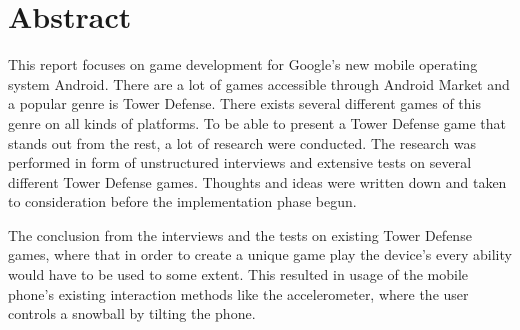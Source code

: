 \section*{Abstract}

This report focuses on game development for Google's new mobile operating system Android. There are a lot of games accessible through Android Market and a popular genre is Tower Defense. There exists several different games of this genre on all kinds of platforms. To be able to present a Tower Defense game that stands out from the rest, a lot of research were conducted. The research was performed in form of unstructured interviews and extensive tests on several different Tower Defense games. Thoughts and ideas were written down and taken to consideration before the implementation phase begun.

The conclusion from the interviews and the tests on existing Tower Defense games, where that in order to create a unique game play the device's every ability would have to be used to some extent. This resulted in usage of the mobile phone's existing interaction methods like the accelerometer, where the user controls a snowball by tilting the phone.
